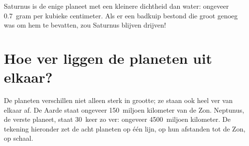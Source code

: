 \begin{remark}\label{rem:g6:earth-a-planet:saturn}
Saturnus is de enige planeet met een kleinere dichtheid dan water:
ongeveer 0.7~gram per kubieke centimeter. Als er een badkuip bestond die
groot genoeg was om hem te bevatten, zou Saturnus blijven drijven!
\end{remark}

\section{Hoe ver liggen de planeten uit elkaar?}

De planeten verschillen niet alleen sterk in grootte; ze staan ook heel ver
van elkaar af. De Aarde staat ongeveer 150~miljoen kilometer van de Zon.
Neptunus, de verste planeet, staat 30~keer zo ver: ongeveer 4500~miljoen
kilometer. De tekening hieronder zet de acht planeten op één lijn, op hun
afstanden tot de Zon, op schaal.

